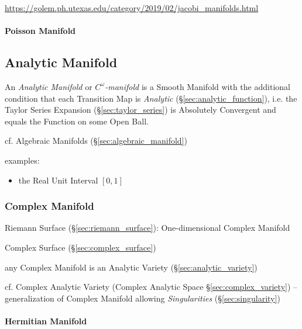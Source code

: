 \url{https://golem.ph.utexas.edu/category/2019/02/jacobi_manifolds.html}



\paragraph{Poisson Manifold}\label{sec:poisson_manifold}\hfill



\subsection{Analytic Manifold}\label{sec:analytic_manifold}

An \emph{Analytic Manifold} or \emph{$C^\omega$-manifold} is a Smooth Manifold
with the additional condition that each Transition Map is \emph{Analytic}
(\S\ref{sec:analytic_function}), i.e. the Taylor Series Expansion
(\S\ref{sec:taylor_series}) is Absolutely Convergent and equals the Function on
some Open Ball.

cf. Algebraic Manifolds (\S\ref{sec:algebraic_manifold})

examples:
\begin{itemize}
  \item the Real Unit Interval $[0,1]$
\end{itemize}



\subsubsection{Complex Manifold}\label{sec:complex_manifold}

Riemann Surface (\S\ref{sec:riemann_surface}): One-dimensional Complex
Manifold


Complex Surface (\S\ref{sec:complex_surface})

any Complex Manifold is an Analytic Variety (\S\ref{sec:analytic_variety})

cf. Complex Analytic Variety (Complex Analytic Space
\S\ref{sec:complex_variety}) -- generalization of Complex Manifold allowing
\emph{Singularities} (\S\ref{sec:singularity})



\paragraph{Hermitian Manifold}\label{sec:hermitian_manifold}\hfill

